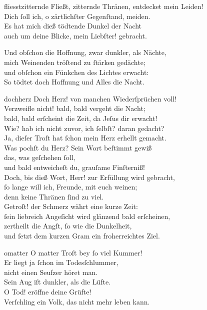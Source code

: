 \documentclass[shorttitlesize=50,tocstyle=ref-genre]{ees}
\begin{document}
{  \begin{movement}{fliesstzitternde}
    \voice[Johannes]
    Fließt, zitternde Thränen, entdecket mein Leiden!\\
    Dich ſoll ich, o zärtlichſter Gegenſtand, meiden.\\
    Es hat mich dieß tödtende Dunkel der Nacht\\
    auch um deine Blicke, mein Liebſter! gebracht.

    Und obſchon die Hoffnung, zwar dunkler, als Nächte,\\
    mich Weinenden tröſtend zu ſtärken gedächte;\\
    und obſchon ein Fünkchen des Lichtes erwacht:\\
    So tödtet doch Hoffnung und Alles die Nacht.
  \end{movement}

  \begin{movement}{dochherz}
    \voice[Johannes]
    Doch Herz! von manchen Wiederſprüchen voll!\\
    Verzweifle nicht! bald, bald vergeht die Nacht;\\
    bald, bald erſcheint die Zeit, da Jeſus dir erwacht!\\
    Wie? hab ich nicht zuvor, ich ſelbſt? daran gedacht?\\
    Ja, dieſer Troſt hat ſchon mein Herz erhellt gemacht.\\
    Was pochſt du Herz? Sein Wort beſtimmt gewiß\\
    das, was geſchehen ſoll,\\
    und bald entweicheſt du, grauſame Finſterniß!\\
    Doch, bis dieß Wort, Herr! zur Erfüllung wird gebracht,\\
    ſo lange will ich, Freunde, mit euch weinen;\\
    denn keine Thränen ſind zu viel.\\
    Getroſt! der Schmerz währt eine kurze Zeit:\\
    ſein liebreich Angeſicht wird glänzend bald erſcheinen,\\
    zertheilt die Angſt, ſo wie die Dunkelheit,\\
    und ſetzt dem kurzen Gram ein froherreichtes Ziel.
  \end{movement}

  \begin{movement}{omatter}
    O matter Troſt bey ſo viel Kummer!\\
    Er liegt ja ſchon im Todesſchlummer,\\
    nicht einen Seufzer höret man.\\
    Sein Aug iſt dunkler, als die Lüfte.\\
    O Tod! eröffne deine Grüfte!\\
    Verſchling ein Volk, das nicht mehr leben kann.


\end{movement}}
\end{document}
